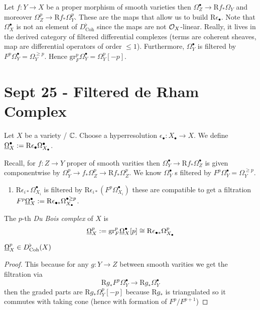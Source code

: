 \documentclass[12pt]{article}
\renewcommand{\gr}{\mathrm{gr}}
\newcommand{\R}{\mathrm{R}}
\begin{document}
Let $f : Y \to X$ be a proper morphism of smooth varieties then $\Omega_Z^\bullet \to \R f_* \Omega_Y$ and moreover $\Omega_Z^p \to \R f_* \Omega_Y^p$. These are the maps that allow us to build $\R \epsilon_{\bullet}$. Note that $\Omega_X^\bullet$ is not an element of $D^\flat_{\text{Coh}}$ since the maps are not $\mathcal{O}_{X}$-linear. Really, it lives in the derived category of filtered differential complexes (terms are coherent sheaves, map are differential operators of order $\le 1$). Furthermore, $\Omega_Y^\bullet$ is filtered by $F^p \Omega_Y^\bullet = \Omega_Y^{\ge p}$. Hence $\gr^p_F \Omega_Y^\bullet = \Omega_Y^p[-p]$. 

\section{Sept 25 - Filtered de Rham Complex}

Let $X$ be a variety / $\mathbb{C}$. Choose a hyperresolution $\epsilon_\bullet : X_\bullet \to X$. We define $\ul{\Omega}_X^\bullet := \R \epsilon_\bullet \Omega_{X_\bullet}^\bullet$. 
\par 
Recall, for $f : Z \to Y$ proper of smooth varities then $\Omega_Y^\bullet \to \R f_* \Omega_Z^\bullet$ is given componentwise by $\Omega_Y^p \to f_* \Omega_Z^p \to \R f_* \Omega_Z^p$. We know $\Omega_Y^\bullet$ s filtered by $F^p \Omega_Y^\bullet = \Omega_Y^{\ge p}$.

\begin{enumerate}
\item $\R \epsilon_{i *} \Omega_{X_i}^\bullet$ is filtered by $\R \epsilon_{i *} (F^p \Omega_{X_i}^\bullet)$ these are compatible to get a filtration $F^p \ul{\Omega}_X^\bullet := \R \epsilon_{\bullet *} \Omega_{X_\bullet}^{\bullet \ge p}$.
\end{enumerate}

\begin{defn}
The $p$-th \textit{Du Bois complex} of $X$ is
\[ \ul{\Omega}_X^p := \gr^p_F \ul{\Omega}_X^\bullet [p] \cong \R \epsilon_{\bullet *} \Omega_{X_\bullet}^p \]
\end{defn}

\begin{lemma}
$\underline{\Omega}^p_X \in D^{\flat}_{\mathrm{Coh}}(X)$
\end{lemma}

\begin{proof}
This because for any $g : Y \to Z$ between smooth varities we get the filtration via
\[ \R g_* F^p \Omega_Y^\bullet \to \R g_* \Omega_Y^\bullet \]
then the graded parts are $\R g_* \Omega_Y^p[-p]$ because $\R g_*$ is triangulated so it commutes with taking cone (hence with formation of $F^p / F^{p+1}$)
\end{proof}
\end{document}
